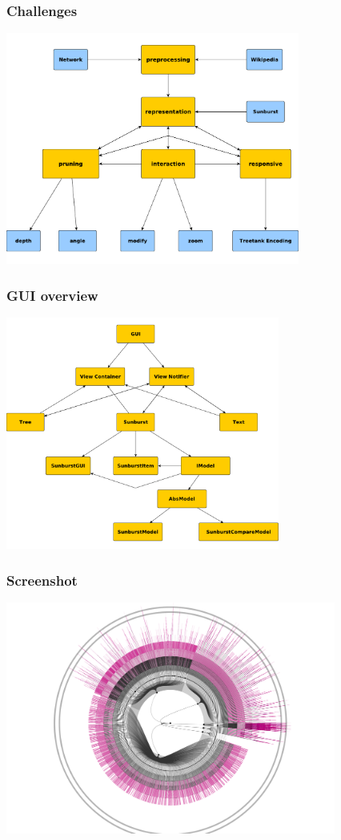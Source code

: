 \documentclass{beamer}
\begin{document}
\begin{frame}
\frametitle{Challenges}
\begin{center}
\includegraphics[height=3.0in]{images/challenges.pdf}
\end{center}
\end{frame}

\begin{frame}
\frametitle{GUI overview}
\begin{center}
\includegraphics[height=3.0in]{images/overview.pdf}
\end{center}
\end{frame}

\begin{frame}
\frametitle{Screenshot}
\includegraphics[height=3.0in]{images/101231_005715.pdf}
\end{frame}
\end{document}
